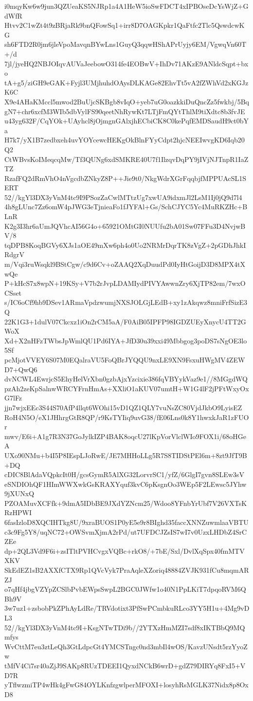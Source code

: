 i0mqyKw6w9jun3QZUeaKS5NJRp1a4A1HeW5ioSwFDCT4xIPBOseDcYsWjZ+GdWfR
Htvv2C1wZt4t9zBRjaRk9bnQFowSq1+irr8D7OAGKpkr1QaFtfc2Tlc5QswdcwKG
sh6FTD2R0jm6jleVpoMavqnBYwLns1GuyQ3qqwHShAPrUyjy6EM/VgwqVn60T+/d
7jl/jyeHQ2NBJOIqvAUVaJeebowO314fe4EOBwV+IhDv71AKzE9ANldcSqpt+bxo
tA+g5/ziGH9eGAK+Fyjl3UMjhuhdOAysDLKAGe82EhvTt5vA2fZWhVd2xKGJzK6C
X9e4AHaKMccl5mwod2BuUjcSKBgb8vIqO+yeb7uG0oazkkiDuQncZz5fwkbj/5Bq
gN7+chr6xcfM3WIb5dbVylFS90qeetNhRywKt7LTjFmQYtThlM9tiXdtc8b3fvJE
u43yg632F/CqYOk+UAyhcl8jOjmgnGAlxjhECbiCK8C0kePqfEMDSaudH9ct0bYa
H7k7/yX1B7zedbxeh4uvYOYcewcHEKgOkBlnFYyCdpt2hjcNEEIwvgKD6Iqb20Q2
CtWBvsKoIMeqcqMw/Tf3QUNg6xdSMKRE40U7f1IlzqvDqPY9jIVjNJTnpR1IaZTZ
RzafFQ2dRmVhO4nVgcdbZNkyZ8P++Jie9t0/NkgWdrXGrFqqbjfMPPUAcSL1SERT
52//kgYl3DX3yVnM4tc9I9PSozZaCwlMTtzUg7xwUA9idxmJl2LsM1Ij0jQ9d7l4
4h8gLUnc7Zz6omW4pJWG3eTjnieaFo1fJYFAl+Gs/SchCJYC5Yc4MuRKZHc+BLnR
K2g3I3hr6aUmJQVhcAI56G4o+65921OMtGI0NUUfu2bA01Sw07FFu3D4NvjwBV/8
tqDPB8KoqBGVy6XJs1aOE49mXw6ph4o0Uo2NRMrDqrTK8zVgZ+2pGDhJhkIRdgrV
m/Vqi3ruWsqkl9BStCgw/c9d6Cv+oZAAQ2XqDuudPd0IyHtGoijD3D8MPX4tXwQe
P+kHcS7x8wpN+19KSy+V7b2rJvpLDAMIydPIVYAwwnZry6XjTP82em/7wxOCSset
s/IC6oCf9hb9DSev1ARmaVpdzwumjNXSJOLGjLEdB+xy1zAkqwz8mniFrfSizE3Q
22K1G3+1dulV07Ckcxz1iOn2rCM5aA/F0AiB05IPFP98IGDZUEyXnycU4TT2GWoX
Xd+X2nHFzTWbsJpWmlQU1Pd6IYA+JfD30u39xxi49Mbbgog3poDS7sNgOE3lo5Sf
pcMjotVVEY6S07M0EQalraVU5FoQBrJYQQU9nxLE9XN9FsxuHWgMV4ZEWD7+QwQ6
dvNCWL4EwrjcS5EhyHelVrXbn0gzbAjxYzcixie386fqVBYykVaz9e1//8MGgdWQ
pzAh2zeKpSalnwWRCYFrnHmAs+XXliO1aKUV07umtH+W1G4lF2jPFtWxyOxG7lFz
jjn7wjxEEc3S44S70AfP4llqt6WOhi15vD1QZ1QLY7vuNsZC80VjdJkbO9LyisEZ
RoH4N5O/eX1JHhrgGtR8QP/r9KsTYIiq9uvG38/fE06Lns0k8Y1hwxkJaR1zFUOr
mwv/E6i+A1g7R3N37GoJylkIZP4BAK8oqcU27lKpVorVlclWIo9FOX1i/68oHGeA
UXo90NMu+b4I5P8IEspLJoRwE/JE7MHHoLLg5R7S8TIDStPEl6m+8zt9JfT9B+DQ
cDIC8BlAdaVQpkcIt0H/gcsGymR5AlXG32LorvrSC1/yfZ/6GlgI7gvn8SLEw3sV
eSNDIOhQF1HImWWXwkGsKRAXYquf3kvC6pKsgnOo3WEp5F2LEwsc5JYhw9jXUNxQ
PZOAMuvXCFfk+9dmA5IDbBE9JXdYZNcm25/Wdoo8YFnbYrUbf7V26VXTsKRzHPWI
6fasIzloD8XQCIHTkg8U/9xraBUOS1P0yE5e9r8BIghd35faccXNNZuwmlaaVBTU
c3c9Fg5Y8/uqNC72+OWSvmXjmA2rPd/ut7UFDCJZsIS7wI7v0UzxLHDbZ4SrCZEe
dp+2QL3Vd9F6i+zsITltPVHCvgxVQBc+rkO8/+7bE/Sxl/DvlXqSpx40fmMTVXKV
SkEdEZ1sB2AXXfCTX9Rp1QVcVyk7PraAqleXZoriq48884ZVJK931fCu8mqmARZJ
o7qHf4jbgVZYpZCSlbPvbEWpsSwpL2BGC0JWfw1o40N1PpLKiT7dpqoRVM6QBh9V
3w7uz1+zsbobPkZPhAyLdRe/TRVdotixt3PfSwPCmbkuRLco3YY5H1u+4Mg9vDL3
52//kgYl3DX3yVnM4tc9I+KsgNTwTDi9b//2YTXzHmMZI7sdf8xIKTBbQ9MQmfys
WvCttM7eu3ztLeQh3GtLdpcGt4YMCSTngc0nd3mbIl4wOS/KavzUNsdt5rzYyoZw
tMfV4Ci7sr40aZjJ9SAKp8RUzTDEEI1QyxdNCkB6wrD+gdZ79DIRYq8FxI5+VD7R
yTflwzmiTP4wHk4gFwG84OYLKnfzgwlperMFOXI+losyhRsMGLK37Nidx8p8OxD8
